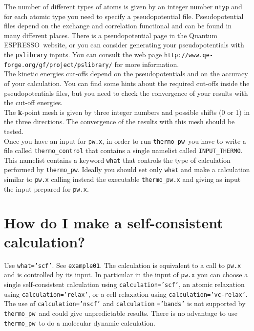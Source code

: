 \documentclass[12pt,a4paper]{article}
\def\qe{{\sc Quantum ESPRESSO}}
\def\thermo{\texttt{thermo\_pw}}
\begin{document}
The number of different types of atoms is given by an integer number 
\texttt{ntyp} and for each atomic type you need to specify a 
pseudopotential file. Pseudopotential files depend on the exchange and 
correlation functional and can be found in many 
different places. There is a pseudopotential page in the \qe\ website, or 
you can consider generating your pseudopotentials with the \texttt{pslibrary} 
inputs. You can consult the web page \texttt{http://www.qe-forge.org/gf/project/pslibrary/} for more information. \\

The kinetic energies cut-offs depend on the pseudopotentials
and on the accuracy of your calculation. You can 
find some hints about the required cut-offs inside the pseudopotentials files,
but you need to check the convergence of your results with the cut-off 
energies. \\

The {\bf k}-point mesh is given by three integer numbers and possible
shifts (0 or 1) in the three directions. The convergence of the results
with this mesh should be tested. \\

Once you have an input for \texttt{pw.x}, in order to run \thermo\ you
have to write a file called \texttt{thermo\_control} that contains a single
namelist called \texttt{INPUT\_THERMO}. This namelist contains a keyword
\texttt{what} that controls the type of calculation performed by 
\thermo. Ideally you should set only \texttt{what} and make a calculation
similar to \texttt{pw.x} calling instead the executable \texttt{thermo\_pw.x}
and giving as input the input prepared for \texttt{pw.x}.

\section{\color{coral}How do I make a self-consistent calculation?}
Use \texttt{what='scf'}. See \texttt{example01}. The calculation is
equivalent to a call to \texttt{pw.x} and is controlled by
its input. In particular in the input of \texttt{pw.x} you can choose
a single self-consistent calculation using \texttt{calculation='scf'}, 
an atomic relaxation using \texttt{calculation='relax'}, or a cell relaxation 
using \texttt{calculation='vc-relax'}.
The use of \texttt{calculation='nscf'} and \texttt{calculation}
\texttt{='bands'} is
not supported by \thermo\ and could give unpredictable results.
There is no advantage to use \thermo\ to do a molecular dynamic
calculation. 
\end{document}
